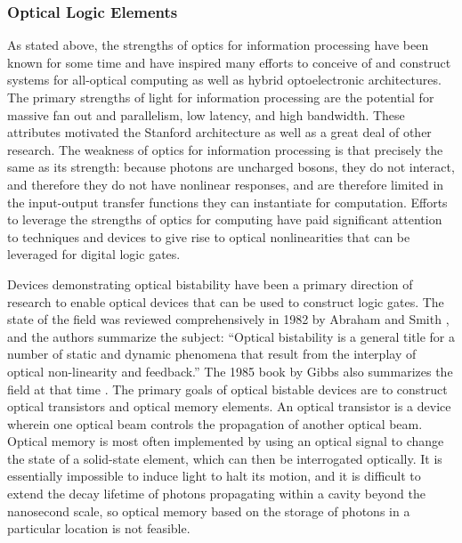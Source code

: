 \subsubsection{Optical Logic Elements}
As stated above, the strengths of optics for information processing have been known for some time and have inspired many efforts to conceive of and construct systems for all-optical computing as well as hybrid optoelectronic architectures. The primary strengths of light for information processing are the potential for massive fan out and parallelism, low latency, and high bandwidth. These attributes motivated the Stanford architecture as well as a great deal of other research. The weakness of optics for information processing is that precisely the same as its strength: because photons are uncharged bosons, they do not interact, and therefore they do not have nonlinear responses, and are therefore limited in the input-output transfer functions they can instantiate for computation. Efforts to leverage the strengths of optics for computing have paid significant attention to techniques and devices to give rise to optical nonlinearities that can be leveraged for digital logic gates.

Devices demonstrating optical bistability have been a primary direction of research to enable optical devices that can be used to construct logic gates. The state of the field was reviewed comprehensively in 1982 by Abraham and Smith \cite{abms1982}, and the authors summarize the subject: ``Optical bistability is a general title for a number of static and dynamic phenomena that result from the interplay of optical non-linearity and feedback.'' The 1985 book by Gibbs also summarizes the field at that time \cite{gi1985}. The primary goals of optical bistable devices are to construct optical transistors and optical memory elements. An optical transistor is a device wherein one optical beam controls the propagation of another optical beam. Optical memory is most often implemented by using an optical signal to change the state of a solid-state element, which can then be interrogated optically. It is essentially impossible to induce light to halt its motion, and it is difficult to extend the decay lifetime of photons propagating within a cavity beyond the nanosecond scale, so optical memory based on the storage of photons in a particular location is not feasible.

